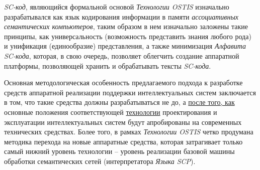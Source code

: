 \textit{SC-код}, являющийся формальной основой \textit{Технологии OSTIS} изначально разрабатывался как язык кодирования информации в памяти \textit{ассоциативных семантических компьютеров}, таким образом в нем изначально заложены такие принципы, как универсальность (возможность представить знания любого рода) и унификация (единообразие) представления, а также минимизация \textit{Алфавита SC-кода}, которая, в свою очередь, позволяет облегчить создание аппаратной платформы, позволяющей хранить и обрабатывать тексты \textit{SC-кода}.

Основная методологическая особенность предлагаемого подхода к разработке средств аппаратной реализации поддержки интеллектуальных систем заключается в том, что такие средства должны разрабатываться не до, а \underline{после того, как} основные положения соответствующей \underline{технологии} проектирования и эксплуатации интеллектуальных систем будут апробированы на современных технических средствах. Более того, в рамках \textit{\textit{Технологии OSTIS}} четко продумана методика перехода на новые аппаратные средства, которая затрагивает только самый нижний уровень технологии -- уровень реализации базовой машины обработки семантических сетей (интерпретатора \textit{Языка SCP}).


